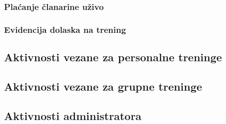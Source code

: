 \documentclass[a4paper]{article}
\begin{document}
\subsubsection{Plaćanje članarine uživo}


\subsubsection{Evidencija dolaska na trening}


\newpage
\subsection{Aktivnosti vezane za personalne treninge}


\subsection{Aktivnosti vezane za grupne treninge}


\subsection{Aktivnosti administratora}
\end{document}

